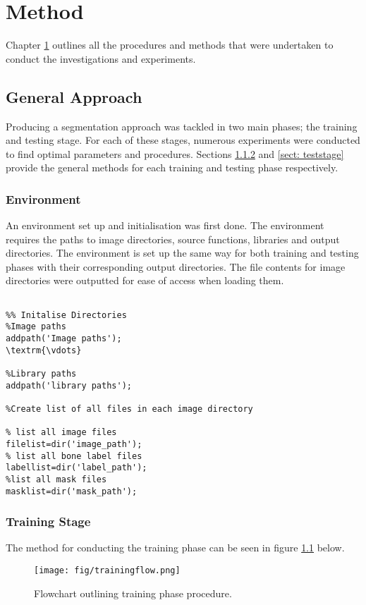 \chapter{Method}
\label{chpt: method}

Chapter \ref{chpt: method} outlines all the procedures and methods that were undertaken to conduct the investigations and experiments. 

\section{General Approach}
Producing a segmentation approach was tackled in two main phases; the training and testing stage. For each of these stages, numerous experiments were conducted to find optimal parameters and procedures. Sections \ref{sect: trainstage} and \ref{sect: teststage} provide the general methods for each training and testing phase respectively.

\subsection{Environment}
An environment set up and initialisation was first done. The environment requires the paths to image directories, source functions, libraries and output directories. The environment is set up the same way for both training and testing phases with their corresponding output directories. The file contents for image directories were outputted for ease of access when loading them.  
\begin{lstlisting}

%% Initalise Directories 
%Image paths
addpath('Image paths');
\textrm{\vdots}

%Library paths
addpath('library paths');

%Create list of all files in each image directory

% list all image files
filelist=dir('image_path'); 
% list all bone label files
labellist=dir('label_path');
%list all mask files 
masklist=dir('mask_path'); 
\end{lstlisting}

\subsection{Training Stage} 
\label{sect: trainstage}
The method for conducting the training phase can be seen in figure \ref{fig: trainflow} below. 

\begin{figure}[H]
\centering
\texttt{[image: fig/trainingflow.png]}
\label{fig: trainflow}
\caption{Flowchart outlining training phase procedure.}
\end{figure}

